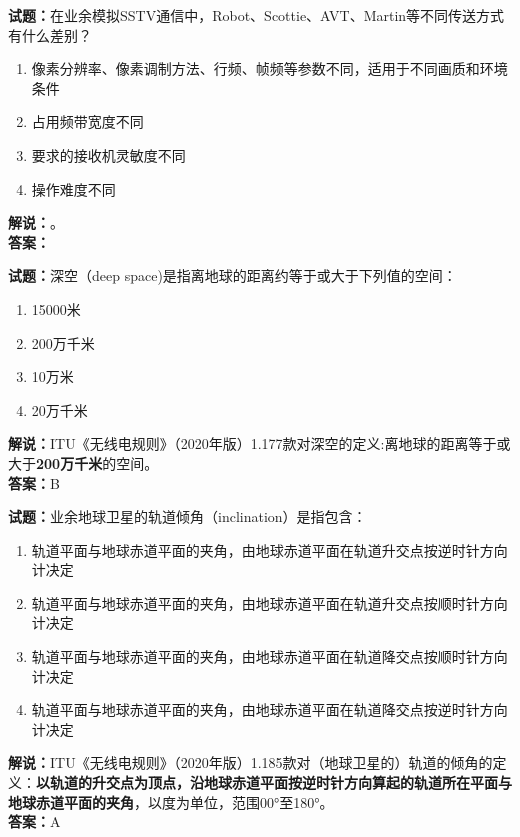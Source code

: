 \documentclass{ctexbook}
\begin{document}
\bigskip

\noindent\textbf{试题：}在业余模拟SSTV通信中，Robot、Scottie、AVT、Martin等不同传送方式有什么差别？
\begin{enumerate}[leftmargin=3em]
  \item 像素分辨率、像素调制方法、行频、帧频等参数不同，适用于不同画质和环境条件
  \item 占用频带宽度不同
  \item 要求的接收机灵敏度不同
  \item 操作难度不同
\end{enumerate}
\noindent\textbf{解说：}\textbf{}。\\\noindent\textbf{答案：}

\bigskip

\noindent\textbf{试题：}深空（deep space)是指离地球的距离约等于或大于下列值的空间：
\begin{enumerate}[leftmargin=3em]
  \item 15000米
  \item 200万千米
  \item 10万米
  \item 20万千米
\end{enumerate}
\noindent\textbf{解说：}ITU《无线电规则》（2020年版）1.177款对深空的定义:离地球的距离等于或大于\textbf{200万千米}的空间。\\\noindent\textbf{答案：}B

\bigskip

\noindent\textbf{试题：}业余地球卫星的轨道倾角（inclination）是指包含：
\begin{enumerate}[leftmargin=3em]
  \item 轨道平面与地球赤道平面的夹角，由地球赤道平面在轨道升交点按逆时针方向计决定
  \item 轨道平面与地球赤道平面的夹角，由地球赤道平面在轨道升交点按顺时针方向计决定
  \item 轨道平面与地球赤道平面的夹角，由地球赤道平面在轨道降交点按顺时针方向计决定
  \item 轨道平面与地球赤道平面的夹角，由地球赤道平面在轨道降交点按逆时针方向计决定
\end{enumerate}
\noindent\textbf{解说：}ITU《无线电规则》（2020年版）1.185款对（地球卫星的）轨道的倾角的定义：\textbf{以轨道的升交点为顶点，沿地球赤道平面按逆时针方向算起的轨道所在平面与地球赤道平面的夹角}，以度为单位，范围\ang{00;;}至\ang{180;;}。\\\noindent\textbf{答案：}A

\bigskip
\end{document}
